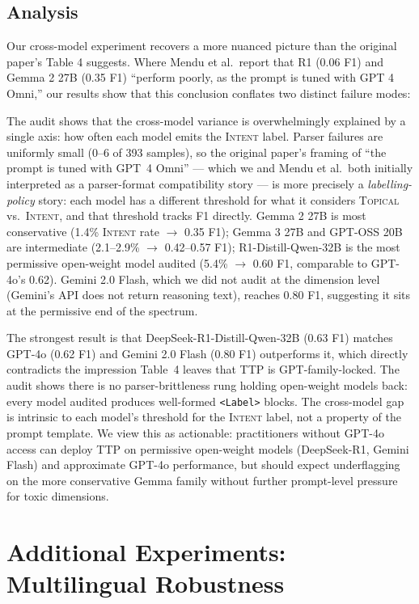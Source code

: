 \documentclass[10pt]{article} %
\begin{document}
\subsection{Analysis}

Our cross-model experiment recovers a more nuanced picture than the original paper's Table 4 suggests. Where Mendu et al.\ report that R1 (0.06 F1) and Gemma 2 27B (0.35 F1) ``perform poorly, as the prompt is tuned with GPT 4 Omni,'' our results show that this conclusion conflates two distinct failure modes:

The audit shows that the cross-model variance is overwhelmingly explained by a single axis: how often each model emits the \textsc{Intent} label. Parser failures are uniformly small (0--6 of 393 samples), so the original paper's framing of ``the prompt is tuned with GPT~4 Omni'' --- which we and Mendu et al.\ both initially interpreted as a parser-format compatibility story --- is more precisely a \emph{labelling-policy} story: each model has a different threshold for what it considers \textsc{Topical} vs.\ \textsc{Intent}, and that threshold tracks F1 directly. Gemma 2 27B is most conservative (1.4\% \textsc{Intent} rate $\to$ 0.35 F1); Gemma 3 27B and GPT-OSS 20B are intermediate (2.1--2.9\% $\to$ 0.42--0.57 F1); R1-Distill-Qwen-32B is the most permissive open-weight model audited (5.4\% $\to$ 0.60 F1, comparable to GPT-4o's 0.62). Gemini 2.0 Flash, which we did not audit at the dimension level (Gemini's API does not return reasoning text), reaches 0.80 F1, suggesting it sits at the permissive end of the spectrum.

The strongest result is that DeepSeek-R1-Distill-Qwen-32B (0.63 F1) matches GPT-4o (0.62 F1) and Gemini 2.0 Flash (0.80 F1) outperforms it, which directly contradicts the impression Table~4 leaves that TTP is GPT-family-locked. The audit shows there is no parser-brittleness rung holding open-weight models back: every model audited produces well-formed \texttt{<Label>} blocks. The cross-model gap is intrinsic to each model's threshold for the \textsc{Intent} label, not a property of the prompt template. We view this as actionable: practitioners without GPT-4o access can deploy TTP on permissive open-weight models (DeepSeek-R1, Gemini Flash) and approximate GPT-4o performance, but should expect underflagging on the more conservative Gemma family without further prompt-level pressure for toxic dimensions.

\section{Additional Experiments: Multilingual Robustness}
\label{sec:multilingual}
\end{document}
